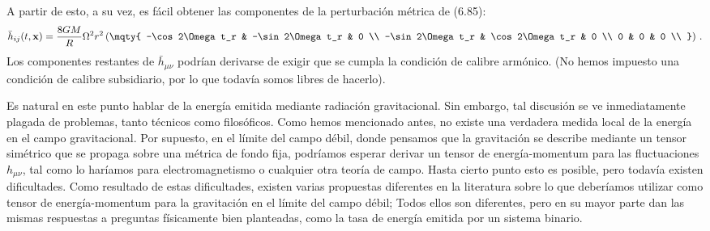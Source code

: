 \documentclass[11pt,b5paper,openany,twoside]{book}
\newcommand{\mn}{{\mu\nu}}
\def\bh{{\bar h}}
\def\x{\mathbf{x}}
\begin{document}
A partir de esto, a su vez, es fácil obtener las componentes de la perturbación métrica de (6.85):
\begin{equation}
\bh_{ij}(t,\x) = {{8GM}\over R}\Omega^2r^2\left(\mqty{
-\cos2\Omega t_r & -\sin2\Omega t_r & 0 \\
-\sin2\Omega t_r & \cos2\Omega t_r & 0  \\
0 & 0 & 0 \\ }\right)\,.\label{6.94}
\end{equation}
Los componentes restantes de $\bh_\mn$ podrían derivarse de exigir que se cumpla la condición de calibre armónico.
(No hemos impuesto una condición de calibre subsidiario, por lo que todavía somos libres de hacerlo).

Es natural en este punto hablar de la energía emitida mediante radiación gravitacional.
Sin embargo, tal discusión se ve inmediatamente plagada de problemas, tanto técnicos como filosóficos.
Como hemos mencionado antes, no existe una verdadera medida local de la energía en el campo gravitacional.
Por supuesto, en el límite del campo débil, donde pensamos que la gravitación se describe mediante un tensor simétrico que se propaga sobre una métrica de fondo fija, podríamos esperar derivar un tensor de energía-momentum para las fluctuaciones $h_\mn$, tal como lo haríamos para electromagnetismo o cualquier otra teoría de campo.
Hasta cierto punto esto es posible, pero todavía existen dificultades.
Como resultado de estas dificultades, existen varias propuestas diferentes en la literatura sobre lo que deberíamos utilizar como tensor de energía-momentum para la gravitación en el límite del campo débil; Todos ellos son diferentes, pero en su mayor parte dan las mismas respuestas a preguntas físicamente bien planteadas, como la tasa de energía emitida por un sistema binario.
\end{document}
